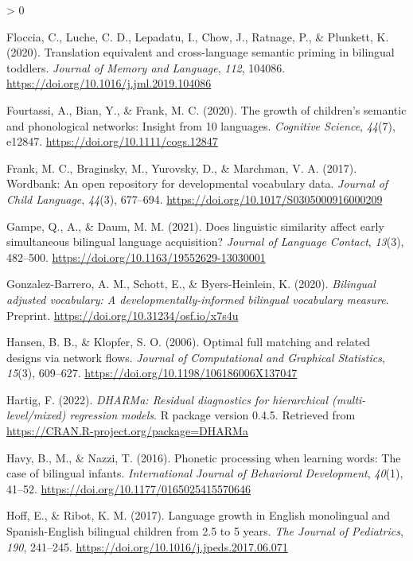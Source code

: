\documentclass[
  english,
  ,man,floatsintext]{apa6}
\newlength{\cslhangindent}
\newenvironment{CSLReferences}[2] %
 {%
  \setlength{\parindent}{0pt}
  \ifodd #1 \everypar{\setlength{\hangindent}{\cslhangindent}}\ignorespaces\fi
  \ifnum #2 > 0
  \setlength{\parskip}{#2\baselineskip}
  \fi
 }%
 {}
\begin{document}
\begin{CSLReferences}{1}{0}
\leavevmode\hypertarget{ref-Floccia_etal_2020}{}%
Floccia, C., Luche, C. D., Lepadatu, I., Chow, J., Ratnage, P., \& Plunkett, K. (2020). Translation equivalent and cross-language semantic priming in bilingual toddlers. \emph{Journal of Memory and Language}, \emph{112}, 104086. \url{https://doi.org/10.1016/j.jml.2019.104086}

\leavevmode\hypertarget{ref-Fourtassi_etal_2020}{}%
Fourtassi, A., Bian, Y., \& Frank, M. C. (2020). The growth of children's semantic and phonological networks: Insight from 10 languages. \emph{Cognitive Science}, \emph{44}(7), e12847. \url{https://doi.org/10.1111/cogs.12847}

\leavevmode\hypertarget{ref-Frank_etal_2017}{}%
Frank, M. C., Braginsky, M., Yurovsky, D., \& Marchman, V. A. (2017). Wordbank: An open repository for developmental vocabulary data. \emph{Journal of Child Language}, \emph{44}(3), 677--694. \url{https://doi.org/10.1017/S0305000916000209}

\leavevmode\hypertarget{ref-Gampe_etal_2021}{}%
Gampe, Q., A., \& Daum, M. M. (2021). Does linguistic similarity affect early simultaneous bilingual language acquisition? \emph{Journal of Language Contact}, \emph{13}(3), 482--500. \url{https://doi.org/10.1163/19552629-13030001}

\leavevmode\hypertarget{ref-Gonzalez-Barrero_2020}{}%
Gonzalez-Barrero, A. M., Schott, E., \& Byers-Heinlein, K. (2020). \emph{Bilingual adjusted vocabulary: A developmentally-informed bilingual vocabulary measure}. Preprint. \url{https://doi.org/10.31234/osf.io/x7s4u}

\leavevmode\hypertarget{ref-Hanson_Klopfer_2006}{}%
Hansen, B. B., \& Klopfer, S. O. (2006). Optimal full matching and related designs via network flows. \emph{Journal of Computational and Graphical Statistics}, \emph{15}(3), 609--627. \url{https://doi.org/10.1198/106186006X137047}

\leavevmode\hypertarget{ref-Hartig_2022}{}%
Hartig, F. (2022). \emph{DHARMa: Residual diagnostics for hierarchical (multi-level/mixed) regression models}. R package version 0.4.5. Retrieved from \url{https://CRAN.R-project.org/package=DHARMa}

\leavevmode\hypertarget{ref-Havy_etal_2016}{}%
Havy, B., M., \& Nazzi, T. (2016). Phonetic processing when learning words: The case of bilingual infants. \emph{International Journal of Behavioral Development}, \emph{40}(1), 41--52. \url{https://doi.org/10.1177/0165025415570646}

\leavevmode\hypertarget{ref-Hoff_Ribot_2017}{}%
Hoff, E., \& Ribot, K. M. (2017). Language growth in {E}nglish monolingual and {S}panish-{E}nglish bilingual children from 2.5 to 5 years. \emph{The Journal of Pediatrics}, \emph{190}, 241--245. \url{https://doi.org/10.1016/j.jpeds.2017.06.071}


\end{CSLReferences}
\end{document}
